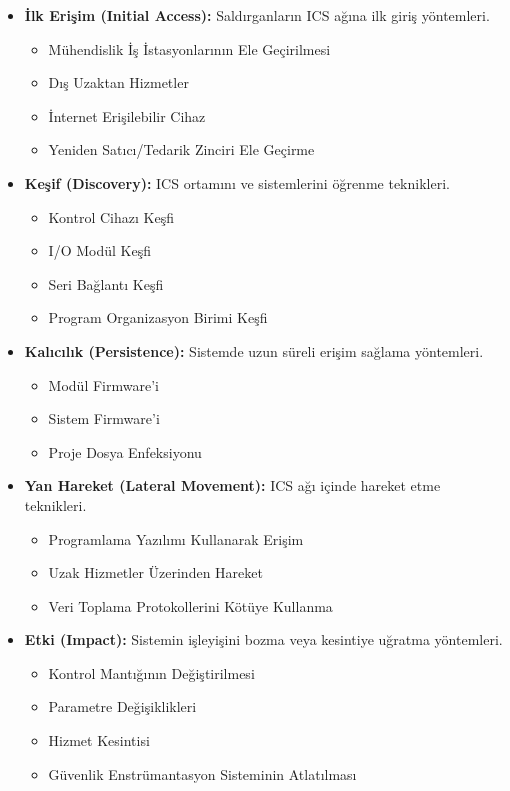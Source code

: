 \begin{itemize}
\item \textbf{İlk Erişim (Initial Access):} Saldırganların ICS ağına ilk giriş yöntemleri.
\begin{itemize}
    \item Mühendislik İş İstasyonlarının Ele Geçirilmesi
    \item Dış Uzaktan Hizmetler
    \item İnternet Erişilebilir Cihaz
    \item Yeniden Satıcı/Tedarik Zinciri Ele Geçirme
\end{itemize}

\item \textbf{Keşif (Discovery):} ICS ortamını ve sistemlerini öğrenme teknikleri.
\begin{itemize}
    \item Kontrol Cihazı Keşfi
    \item I/O Modül Keşfi
    \item Seri Bağlantı Keşfi
    \item Program Organizasyon Birimi Keşfi
\end{itemize}

\item \textbf{Kalıcılık (Persistence):} Sistemde uzun süreli erişim sağlama yöntemleri.
\begin{itemize}
    \item Modül Firmware'i
    \item Sistem Firmware'i
    \item Proje Dosya Enfeksiyonu
\end{itemize}

\item \textbf{Yan Hareket (Lateral Movement):} ICS ağı içinde hareket etme teknikleri.
\begin{itemize}
    \item Programlama Yazılımı Kullanarak Erişim
    \item Uzak Hizmetler Üzerinden Hareket
    \item Veri Toplama Protokollerini Kötüye Kullanma
\end{itemize}

\item \textbf{Etki (Impact):} Sistemin işleyişini bozma veya kesintiye uğratma yöntemleri.
\begin{itemize}
    \item Kontrol Mantığının Değiştirilmesi
    \item Parametre Değişiklikleri
    \item Hizmet Kesintisi
    \item Güvenlik Enstrümantasyon Sisteminin Atlatılması
\end{itemize}
\end{itemize}


